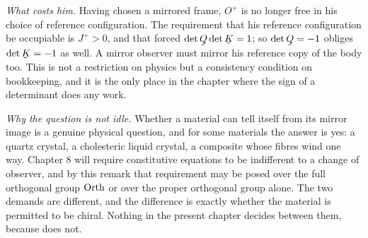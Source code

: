 \begin{remark}
\emph{What  costs him.} Having chosen a mirrored frame,
$O^{+}$ is no longer free in his choice of reference configuration. The
requirement that his reference configuration be occupiable is $J^{+}>0$,
and that forced $\det\bQ\det\bK=1$; so $\det\bQ=-1$ obliges
$\det\bK=-1$ as well. A mirror observer must mirror his reference copy of
the body too. This is not a restriction on physics but a consistency
condition on bookkeeping, and it is the only place in the chapter where
the sign of a determinant does any work.

\emph{Why the question is not idle.} Whether a material can tell itself
from its mirror image is a genuine physical question, and for some
materials the answer is yes: a quartz crystal, a cholesteric liquid
crystal, a composite whose fibres wind one way. Chapter 8 will require
constitutive equations to be indifferent to a change of observer, and by
this remark that requirement may be posed over the full orthogonal group
$\operatorname{Orth}$ or over the proper orthogonal group alone. The two demands are
different, and the difference is exactly whether the material is
permitted to be chiral. Nothing in the present chapter decides between
them, because  does not.
\end{remark}

